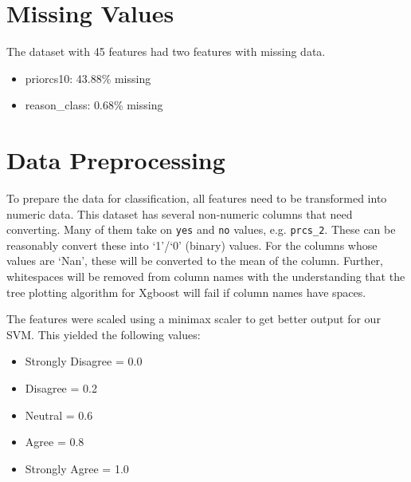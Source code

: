 


\section*{Missing Values}
The dataset with 45 features had two features with missing data.
\begin {itemize}    
\item priorcs10:                    43.88\% missing
\item reason\_class:                 0.68\% missing
\end{itemize} 

\section*{Data Preprocessing}

To prepare the data for classification, all features need to be transformed into numeric data. This dataset has several non-numeric columns that need converting. Many of them take on \texttt{yes} and \texttt{no} values, e.g. \texttt{prcs\_2}. These can be reasonably convert these into `1'/`0' (binary) values. For the columns whose values are `Nan', these will be converted to the mean of the column. Further, whitespaces will be removed from column names with the understanding that the tree plotting algorithm for Xgboost will fail if column names have spaces. 

The features were scaled using a minimax scaler to get better output for our SVM. This yielded the following values:
\begin {itemize}    
\item Strongly Disagree = 0.0
\item Disagree = 0.2
\item Neutral = 0.6
\item Agree = 0.8
\item Strongly Agree = 1.0
\end{itemize} 



